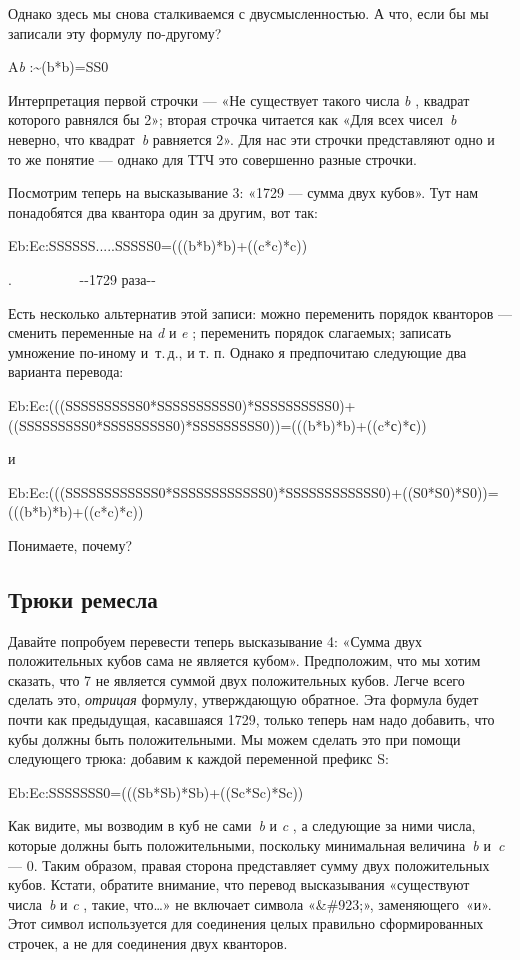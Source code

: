 \documentclass[../main.tex]{subfiles}
\begin{document}
Однако здесь мы снова сталкиваемся с двусмысленностью. А что, если бы мы записали эту формулу по-другому?

A\emph{b} :\textasciitilde(b*b)=SS0

Интерпретация первой строчки --- «Не существует такого числа \emph{b} , квадрат которого равнялся бы 2»; вторая строчка читается как «Для всех чисел~\emph{b} неверно, что квадрат~\emph{b} равняется 2». Для нас эти строчки представляют одно и то же понятие --- однако для ТТЧ это совершенно разные строчки.

Посмотрим теперь на высказывание 3: «1729 --- сумма двух кубов». Тут нам понадобятся два квантора один за другим, вот так:

Eb:Ec:SSSSSS.....SSSSS0=(((b*b)*b)+((c*c)*c))

.~~~~~~~~~ \textbar-\/-1729 раза-\/-\textbar{}

Есть несколько альтернатив этой записи: можно переменить порядок кванторов --- сменить переменные на \emph{d} и \emph{e} ; переменить порядок слагаемых; записать умножение по-иному и~т.\,д., и т. п. Однако я предпочитаю следующие два варианта перевода:

Eb:Ec:(((SSSSSSSSSS0*SSSSSSSSSS0)*SSSSSSSSSS0)+((SSSSSSSSS0*SSSSSSSSS0)*SSSSSSSSS0))=(((b*b)*b)+((c*с)*с))

и

Eb:Ec:(((SSSSSSSSSSSS0*SSSSSSSSSSSS0)*SSSSSSSSSSSS0)+((S0*S0)*S0))=(((b*b)*b)+((c*c)*c))

Понимаете, почему?


\subsection{Трюки ремесла}

Давайте попробуем перевести теперь высказывание 4: «Сумма двух положительных кубов сама не является кубом». Предположим, что мы хотим сказать, что 7 не является суммой двух положительных кубов. Легче всего сделать это, \emph{отрицая} формулу, утверждающую обратное. Эта формула будет почти как предыдущая, касавшаяся 1729, только теперь нам надо добавить, что кубы должны быть положительными. Мы можем сделать это при помощи следующего трюка: добавим к каждой переменной префикс S:

Eb:Ec:SSSSSSS0=(((Sb*Sb)*Sb)+((Sc*Sc)*Sc))

Как видите, мы возводим в куб не сами~\emph{b} и \emph{c} , а следующие за ними числа, которые должны быть положительными, поскольку минимальная величина~\emph{b} и~\emph{c} --- 0. Таким образом, правая сторона представляет сумму двух положительных кубов. Кстати, обратите внимание, что перевод высказывания «существуют числа~\emph{b} и \emph{c} , такие, что\ldots» не включает символа «\&\#923;», заменяющего~«и». Этот символ используется для соединения целых правильно сформированных строчек, а не для соединения двух кванторов.
\end{document}
